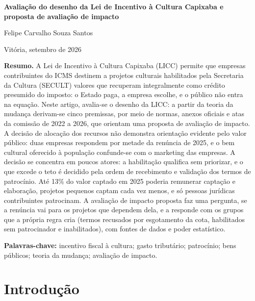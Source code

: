 \documentclass[12pt,a4paper]{article}
\begin{document}
\begin{center}
{\large\bfseries Avaliação do desenho da Lei de Incentivo à Cultura Capixaba e proposta de avaliação de impacto\par}
\vspace{6pt}
Felipe Carvalho Souza Santos\par
\vspace{3pt}
Vitória, setembro de 2026\par
\end{center}

\noindent\textbf{Resumo.} A Lei de Incentivo à Cultura Capixaba (LICC) permite que empresas contribuintes do
ICMS destinem a projetos culturais habilitados pela Secretaria da Cultura (SECULT) valores que
recuperam integralmente como crédito presumido do imposto: o Estado paga, a empresa escolhe, e o
público não entra na equação. Neste artigo, avalia-se o desenho da LICC: a partir da teoria da
mudança derivam-se cinco premissas, por meio de normas, anexos oficiais e atas da comissão de 2022 a
2026, que orientam uma proposta de avaliação de impacto. A decisão de alocação dos recursos não
demonstra orientação evidente pelo valor público: duas empresas respondem por metade da renúncia de
2025, e o bem cultural oferecido à população confunde-se com o marketing das empresas. A decisão se
concentra em poucos atores: a habilitação qualifica sem priorizar, e o que excede o teto é decidido
pela ordem de recebimento e validação dos termos de patrocínio. Até 13\% do valor captado em 2025
poderia remunerar captação e elaboração, projetos pequenos captam cada vez menos, e só pessoas
jurídicas contribuintes patrocinam. A avaliação de impacto proposta faz uma pergunta, se a renúncia
vai para os projetos que dependem dela, e a responde com os grupos que a própria regra cria (termos
recusados por esgotamento da cota, habilitados sem patrocinador e inabilitados), com fontes de dados
e poder estatístico.

\noindent\textbf{Palavras-chave:} incentivo fiscal à cultura; gasto tributário; patrocínio; bens públicos;
teoria da mudança; avaliação de impacto.

\section{Introdução}\label{secao-1}
\end{document}
